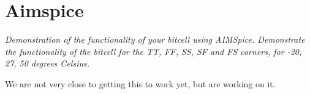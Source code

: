 \section{Aimspice}
\textit{Demonstration of the functionality of your bitcell using AIMSpice. Demonstrate the functionality of the bitcell for the TT, FF, SS, SF and FS corners, for -20, 27, 50 degrees Celsius.}

We are not very close to getting this to work yet, but are working on it.